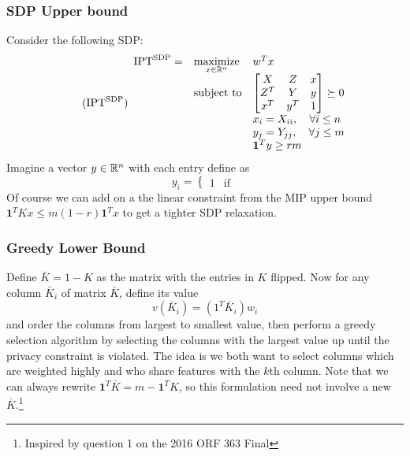 \documentclass[12pt]{article}
\newcommand{\privsdp}{\text{IPT}^\text{SDP}}
\begin{document}
\subsubsection{SDP Upper bound}
Consider the following SDP:
\begin{equation}
	\label{eq:privsdp} 
    \tag{$\privsdp$} 
	\begin{array}{lll}
		\privsdp = & \underset{x\in\mr^n}{\text{maximize}} & w^T x \\
		& \mbox{subject to} &  
        \begin{bmatrix}
            \begin{matrix}
                X
            \end{matrix}  & 
            \begin{matrix}
                Z
            \end{matrix} & x \\
            \begin{matrix}
                Z^T 
            \end{matrix} & 
            \begin{matrix}
                Y 
            \end{matrix} & y \\
            x^T & y^T & 1
        \end{bmatrix} \succeq 0\\
        && x_i = X_{ii}, \quad \forall i\leq n\\
        && y_j = Y_{jj}, \quad \forall j \leq m\\
        && \mathbf{1}^Ty \geq rm
		\end{array}
\end{equation}
Imagine a vector $y \in \mathbb{R}^n$ with each entry define as
\[y_i = \begin{cases}
    1 & \text{if } 
\end{cases}\]
Of course we can add on a the linear constraint from the MIP upper bound $\mathbf{1}^TKx \leq m(1-r)\mathbf{1}^Tx$ to get a tighter SDP relaxation.

\subsubsection{Greedy Lower Bound}
    Define $\bar{K} = 1 - K$ as the matrix with the entries in $K$ flipped. Now for any column $\bar{K}_i$ of matrix $\bar{K}$, define its value \[v(\bar{K}_i) = (1^T \bar{K}_i) w_i\] and order the columns from largest to smallest value, then perform a greedy selection algorithm by selecting the columns with the largest value up until the privacy constraint is violated. The idea is we both want to select columns which are weighted highly and who share features with the $k$th column.  Note that we can always rewrite $\mathbf{1}^T\bar{K} = m - \mathbf{1}^TK$, so this formulation need not involve a new $\overline{K}$.\footnote{Inspired by question 1 on the 2016 ORF 363 Final}
    
\end{document}
